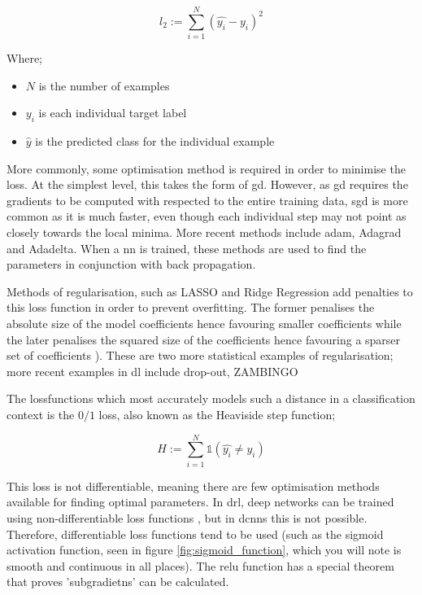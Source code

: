 \begin{equation}
l_2 := \sum_{i = 1}^N (\hat{y_i} - y_i)^2
\end{equation}

Where;

\begin{itemize}
\item $N$ is the number of examples  
\item $y_i$ is each individual target label  
\item $\hat{y}$ is the predicted class for the individual example 
\end{itemize}

More commonly, some optimisation method is required in order to minimise the \gls{loss}.  At the simplest level, this takes the form of \gls{gd}. However, as \gls{gd} requires the gradients to be computed with respected to the entire training data, \gls{sgd} is more common as it is much faster, even though each individual step may not point as closely towards the local minima. More recent methods include  \gls{adam}, Adagrad and Adadelta. When a \gls{nn} is trained, these methods are used to find the parameters in conjunction with back propagation.  %


Methods of regularisation, such as LASSO and Ridge Regression add penalties to this loss function in order to prevent overfitting. The former penalises the absolute size of the model coefficients hence favouring smaller coefficients while the later penalises the squared size of the coefficients hence favouring a sparser set of coefficients \cite{ridge_lasso}). These are two more statistical examples of regularisation; more recent examples in \gls{dl} include drop-out, ZAMBINGO \bigskip

The \gls{lossfunction}s which most accurately models such a distance in a classification context is the $0/1$ loss, also known as the Heaviside step function;

\begin{equation}
H := \sum_{i = 1}^N \mathds{1} (\hat{y_i} \neq y_i)  
\end{equation}

This loss is not differentiable, meaning there are few optimisation methods available for finding optimal parameters. In \gls{drl}, deep networks can be trained using non-differentiable loss functions \cite{drl_non_differentiable}, but in \gls{dcnn}s this is not possible. Therefore, differentiable loss functions tend to be used (such as the sigmoid activation function, seen in figure \ref{fig:sigmoid_function}, which you will note is smooth and continuous in all places). The \gls{relu} function has a special theorem that proves 'subgradietns' can be calculated.

